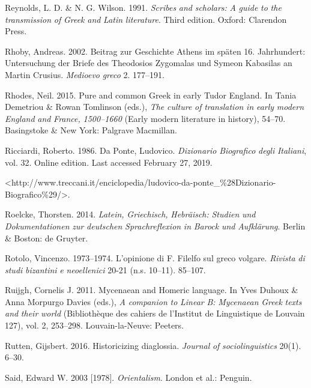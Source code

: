 Reynolds, L. D. \& N. G. Wilson. 1991. \textit{Scribes} \textit{and} \textit{scholars:} \textit{A} \textit{guide} \textit{to} \textit{the} \textit{transmission} \textit{of} \textit{Greek} \textit{and} \textit{Latin} \textit{literature}. Third edition. Oxford: Clarendon Press.

Rhoby, Andreas. 2002. Beitrag zur Geschichte Athens im späten 16. Jahrhundert: Untersuchung der Briefe des Theodosios Zygomalas und Symeon Kabasilas an Martin Crusius. \textit{Medioevo} \textit{greco} 2. 177–191.

Rhodes, Neil. 2015. Pure and common Greek in early Tudor England. In Tania Demetriou \& Rowan Tomlinson (eds.), \textit{The} \textit{culture} \textit{of} \textit{translation} \textit{in} \textit{early} \textit{modern} \textit{England} \textit{and} \textit{France,} \textit{1500–1660} (Early modern literature in history), 54–70. Basingstoke \& New York: Palgrave Macmillan.

Ricciardi, Roberto. 1986. Da Ponte, Ludovico. \textit{Dizionario} \textit{Biografico} \textit{degli} \textit{Italiani}, vol. 32. Online edition. Last accessed February 27, 2019.

<http://www.treccani.it/enciclopedia/ludovico-da-ponte\_\%28Dizionario-Biografico\%29/>.

Roelcke, Thorsten. 2014. \textit{Latein,} \textit{Griechisch,} \textit{Hebräisch:} \textit{Studien} \textit{und} \textit{Dokumentationen} \textit{zur} \textit{deutschen} \textit{Sprachreflexion} \textit{in} \textit{Barock} \textit{und} \textit{Aufklärung}. Berlin \& Boston: de Gruyter.

Rotolo, Vincenzo. 1973–1974. L’opinione di F. Filelfo sul greco volgare. \textit{Rivista} \textit{di} \textit{studi} \textit{bizantini} \textit{e} \textit{neoellenici} 20-21 (n.s. 10–11). 85–107.

Ruijgh, Cornelis J. 2011. Mycenaean and Homeric language. In Yves Duhoux \& Anna Morpurgo Davies (eds.), \textit{A} \textit{companion} \textit{to} \textit{Linear} \textit{B:} \textit{Mycenaean} \textit{Greek} \textit{texts} \textit{and} \textit{their} \textit{world} (Bibliothèque des cahiers de l’Institut de Linguistique de Louvain 127), vol. 2, 253–298. Louvain-la-Neuve: Peeters.

Rutten, Gijsbert. 2016. Historicizing diaglossia. \textit{Journal} \textit{of} \textit{sociolinguistics} 20(1). 6–30.

Said, Edward W. 2003 [1978]. \textit{Orientalism}. London et al.: Penguin.

